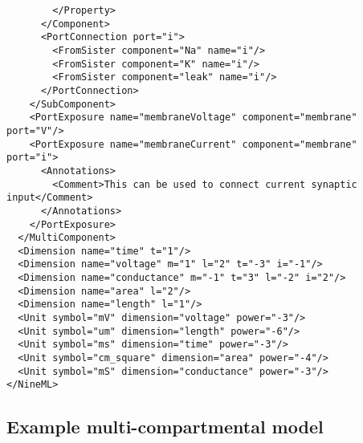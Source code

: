 \documentclass[draftspec]{ninemlspec}
\begin{document}
\begin{lstlisting}
        </Property>
      </Component>
      <PortConnection port="i">
        <FromSister component="Na" name="i"/>
        <FromSister component="K" name="i"/>
        <FromSister component="leak" name="i"/>
      </PortConnection>
    </SubComponent>
    <PortExposure name="membraneVoltage" component="membrane" port="V"/>
    <PortExposure name="membraneCurrent" component="membrane" port="i">
      <Annotations>
        <Comment>This can be used to connect current synaptic input</Comment>
      </Annotations>
    </PortExposure>
  </MultiComponent>
  <Dimension name="time" t="1"/>
  <Dimension name="voltage" m="1" l="2" t="-3" i="-1"/>
  <Dimension name="conductance" m="-1" t="3" l="-2" i="2"/>
  <Dimension name="area" l="2"/>
  <Dimension name="length" l="1"/>
  <Unit symbol="mV" dimension="voltage" power="-3"/>
  <Unit symbol="um" dimension="length" power="-6"/>
  <Unit symbol="ms" dimension="time" power="-3"/>
  <Unit symbol="cm_square" dimension="area" power="-4"/>
  <Unit symbol="mS" dimension="conductance" power="-3"/>  
</NineML>\end{lstlisting}

\clearpage
\subsection{Example multi-compartmental model}
\end{document}
